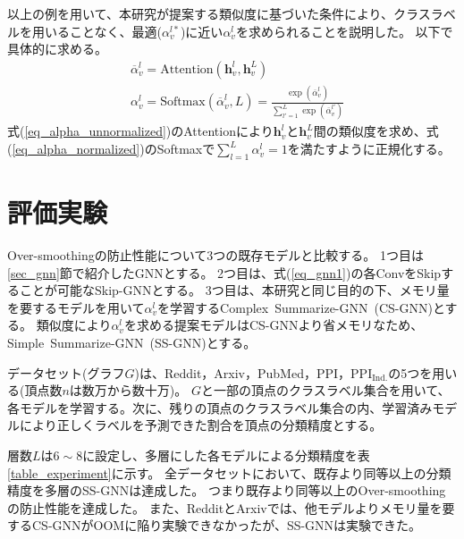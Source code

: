 \documentclass[a4j,twocolumn]{jsarticle}
\begin{document}
以上の例を用いて、本研究が提案する類似度に基づいた条件により、クラスラベルを用いることなく、最適($\alpha_v^{l*}$)に近い$\alpha_v^l$を求められることを説明した。
以下で具体的に求める。
\begin{align}
  & \overline{\alpha}_v^l = \text{Attention}(\bm{h}_v^l, \bm{h}_v^L) \label{eq_alpha_unnormalized} \\
  & \alpha_v^l = \text{Softmax}(\overline{\alpha}_v^l, L) = \frac{\exp(\overline{\alpha}_v^l)}{\sum_{l'=1}^L \exp(\overline{\alpha}_v^{l'})} \label{eq_alpha_normalized}
\end{align}
式(\ref{eq_alpha_unnormalized})のAttention\cite{Vaswani}により$\bm{h}_v^l$と$\bm{h}_v^L$間の類似度を求め、式(\ref{eq_alpha_normalized})のSoftmaxで$\sum_{l=1}^L \alpha_v^l=1$を満たすように正規化する。


\vspace{+4mm}
\section{評価実験}
\label{sec_experiment}
\vspace{-2mm}

Over-smoothingの防止性能について3つの既存モデルと比較する。
1つ目は\ref{sec_gnn}節で紹介したGNN\cite{Kipf}\cite{Velickovic}とする。
2つ目は、式(\ref{eq_gnn1})の各ConvをSkipすることが可能なSkip-GNN\cite{Li}とする。
3つ目は、本研究と同じ目的の下、メモリ量を要するモデルを用いて$\alpha_v^l$を学習するComplex~Summarize-GNN~(CS-GNN)\cite{Xu}とする。
類似度により$\alpha_v^l$を求める提案モデルはCS-GNNより省メモリなため、Simple~Summarize-GNN~(SS-GNN)とする。

データセット(グラフ$G$)は、Reddit，Arxiv，PubMed，PPI，$\text{PPI}_{\text{Ind.}}$の5つを用いる(頂点数$n$は数万から数十万)。
$G$と一部の頂点のクラスラベル集合を用いて、各モデルを学習する。次に、残りの頂点のクラスラベル集合の内、学習済みモデルにより正しくラベルを予測できた割合を頂点の分類精度とする。

層数$L$は$6\sim 8$に設定し、多層にした各モデルによる分類精度を表\ref{table_experiment}に示す。
全データセットにおいて、既存より同等以上の分類精度を多層のSS-GNNは達成した。
つまり既存より同等以上のOver-smoothingの防止性能を達成した。
また、RedditとArxivでは、他モデルよりメモリ量を要するCS-GNNがOOMに陥り実験できなかったが、SS-GNNは実験できた。
\end{document}
